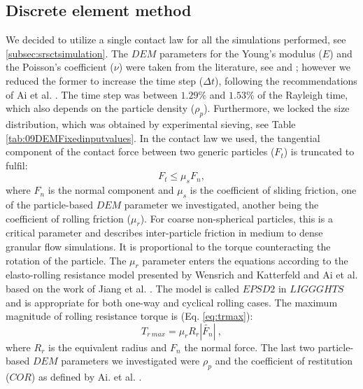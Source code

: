 \documentclass[review]{elsarticle}
\begin{document}
\subsection{Discrete element method}
\label{subsec:dem}

We decided to utilize a single
contact law for all the simulations performed, see
\ref{subsec:srsctsimulation}.
The $DEM$ parameters for the Young's modulus ($E$) and the Poisson's coefficient
($\nu$) were taken from the literature, see \cite{RefWorks:175} 
and \cite{RefWorks:176}; however we reduced the former to increase the time step
($\Delta t$), following the recommendations of Ai et al. \cite{RefWorks:131}.
The time step was between $1.29 \%$ and $1.53 \%$ of the Rayleigh time, which
also depends on the particle density ($\rho_p$).
Furthermore, we locked the size distribution, which was obtained by experimental
sieving, see Table \ref{tab:09DEMFixedinputvalues}.
In the contact law we used, 
the tangential component of the contact force between two generic particles
($F_t$) is truncated to fulfil:
\begin{equation}
F_{t} \leq \mu_s F_{n},
 \label{eq:force_t}
\end{equation}
where $F_n$ is the normal component and $\mu_s$ is the coefficient of sliding
friction, one of the particle-based $DEM$ parameter we investigated, 
another being the coefficient of rolling friction ($\mu_r$). 
For coarse non-spherical particles, this is a critical parameter and describes
inter-particle friction in medium to dense granular flow simulations. It is proportional to the 
torque counteracting the rotation of the particle. The $\mu_r$ parameter enters the 
equations according to the elasto-rolling resistance model presented by Wensrich and 
Katterfeld \cite{RefWorks:87} and Ai et al. \cite{RefWorks:131} 
based on the work of Jiang et al. \cite{RefWorks:143}. 
The model is called $EPSD2$ in $LIGGGHTS$ and is appropriate for both one-way and cyclical rolling cases.
The maximum magnitude of rolling resistance torque is (Eq. \ref{eq:trmax}):
\begin{equation}
T_{r~max} = \mu_r R_r |\tilde{F_n}| ~,
 \label{eq:trmax}
\end{equation}
where $R_r$ is the equivalent radius and $F_n$ the normal force.
The last two particle-based $DEM$ parameters we investigated were $\rho_p$
and the coefficient of restitution ($COR$) as defined by Ai. et al. \cite{RefWorks:131}.
\end{document}

